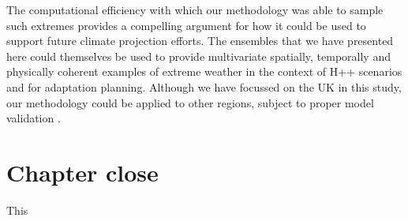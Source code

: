   The computational efficiency with which our methodology was able to sample such extremes provides a compelling argument for how it could be used to support future climate projection efforts. The ensembles that we have presented here could themselves be used to provide  multivariate spatially, temporally and physically coherent examples of extreme weather in the context of H++ scenarios and for adaptation planning. Although we have focussed on the UK in this study, our methodology could be applied to other regions, subject to proper model validation \citep{murphy_ukcp18_2018,watson_multi-thousand_2020}.
  
\section{Chapter close}

  This 